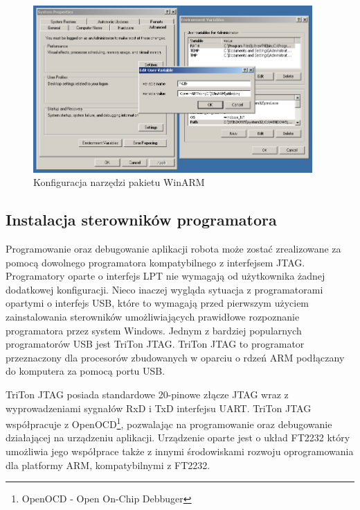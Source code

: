 \begin{figure}[ht!]
 \centering
 \includegraphics[width=0.95\textwidth]{../images/ch03/winarm-config-win32.png}
 \caption{Konfiguracja narzędzi pakietu WinARM}
 \label{fig:winarm-config}
\end{figure}

\subsection{Instalacja sterowników programatora}
Programowanie oraz debugowanie aplikacji robota może zostać zrealizowane za
pomocą dowolnego programatora kompatybilnego z interfejsem JTAG. Programatory
oparte o interfejs LPT nie wymagają od użytkownika żadnej dodatkowej
konfiguracji. Nieco inaczej wygląda sytuacja z programatorami opartymi o
interfejs USB, które to wymagają przed pierwszym użyciem zainstalowania
sterowników umożliwiających prawidłowe rozpoznanie programatora przez system
Windows. Jednym z bardziej popularnych programatorów USB jest TriTon JTAG. TriTon
JTAG to programator przeznaczony dla procesorów zbudowanych w oparciu o rdzeń ARM
podłączany do komputera za pomocą portu USB.

 TriTon JTAG posiada standardowe 20-pinowe złącze JTAG wraz z wyprowadzeniami
 sygnałów RxD i TxD interfejsu UART. TriTon JTAG współpracuje z
 OpenOCD\footnote{OpenOCD - Open On-Chip Debbuger}, pozwalając na programowanie
 oraz debugowanie działającej na urządzeniu aplikacji. Urządzenie oparte jest o
 układ FT2232 który umożliwia jego współprace także z innymi środowiskami rozwoju
 oprogramowania dla platformy ARM, kompatybilnymi z FT2232.

